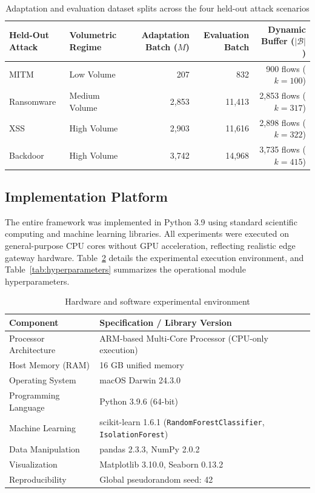 \begin{table}[!ht]
\centering
\small
\setlength{\tabcolsep}{5pt}
\renewcommand{\arraystretch}{1.2}
\caption{Adaptation and evaluation dataset splits across the four held-out attack scenarios}
\label{tab:loao_splits_pw}
\begin{tabular}{|l|l|r|r|r|}
\hline
\textbf{Held-Out Attack} & \textbf{Volumetric Regime} & \textbf{Adaptation Batch ($M$)} & \textbf{Evaluation Batch} & \textbf{Dynamic Buffer ($|\mathcal{B}|$)} \\ \hline
MITM       & Low Volume    & 207      & 832      & 900 flows ($k = 100$) \\
Ransomware & Medium Volume & 2{,}853  & 11{,}413 & 2{,}853 flows ($k = 317$) \\
XSS        & High Volume   & 2{,}903  & 11{,}616 & 2{,}898 flows ($k = 322$) \\
Backdoor   & High Volume   & 3{,}742  & 14{,}968 & 3{,}735 flows ($k = 415$) \\ \hline
\end{tabular}
\end{table}

\subsection{Implementation Platform}
\label{subsec:platform}

The entire framework was implemented in Python 3.9 using standard scientific computing and machine learning libraries. All experiments were executed on general-purpose CPU cores without GPU acceleration, reflecting realistic edge gateway hardware. Table~\ref{tab:platform} details the experimental execution environment, and Table~\ref{tab:hyperparameters} summarizes the operational module hyperparameters.

\begin{table}[htpb]
\centering
\small
\renewcommand{\arraystretch}{1.3}
\caption{Hardware and software experimental environment}
\label{tab:platform}
\begin{tabular}{|p{4.2cm}|p{8.5cm}|}
\hline
\textbf{Component} & \textbf{Specification / Library Version} \\ \hline
Processor Architecture & ARM-based Multi-Core Processor (CPU-only execution) \\
Host Memory (RAM)      & 16 GB unified memory \\
Operating System       & macOS Darwin 24.3.0 \\
Programming Language   & Python 3.9.6 (64-bit) \\
Machine Learning       & scikit-learn 1.6.1 (\texttt{RandomForestClassifier}, \texttt{IsolationForest}) \\
Data Manipulation      & pandas 2.3.3, NumPy 2.0.2 \\
Visualization          & Matplotlib 3.10.0, Seaborn 0.13.2 \\
Reproducibility        & Global pseudorandom seed: 42 \\ \hline
\end{tabular}
\end{table}

